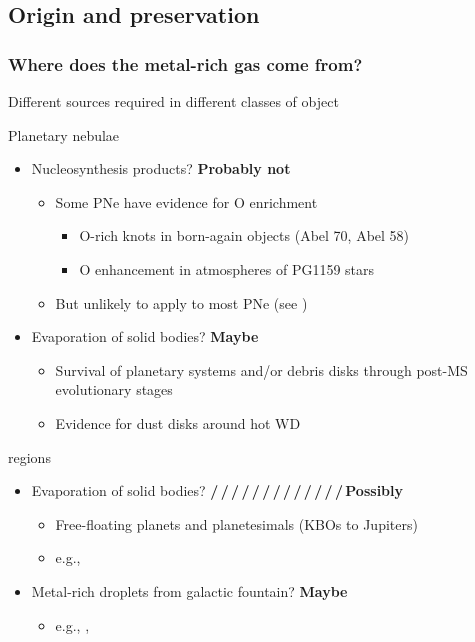 \documentclass[presentation, compress]{beamer}
\providecommand{\alert}[1]{\textbf{#1}}
\begin{document}
\subsection{Origin and preservation}
\begin{frame}
\frametitle{Where does the metal-rich gas come from?}
\label{sec-3-2}
Different sources required in different classes of object
\begin{overprint}
\begin{block}{Planetary nebulae}
\begin{itemize}
\item Nucleosynthesis products? \quad \alert{Probably not}
  \begin{itemize}
  \item Some PNe have evidence for O enrichment
    \begin{itemize}
    \item O-rich knots in born-again objects (Abel 70, Abel 58)
    \item O enhancement in atmospheres of PG1159 stars
    \end{itemize}
  \item But unlikely to apply to most PNe (see )
  \end{itemize}
\item Evaporation of solid bodies?  \quad \alert{Maybe}
  \begin{itemize}
  \item Survival of planetary systems and/or debris disks through post-MS evolutionary stages
  \item Evidence for dust disks around hot WD 
  \end{itemize}
\end{itemize}
\end{block}

\begin{block}{\hii{} regions}
\begin{itemize}
\item Evaporation of solid bodies? \quad \alert{\textcolor{structure.fg}{/\,/\,/\,/\,/\,/\,/\,/\,/\,/\,/\,/\,/\,}\quad Possibly}
  \begin{itemize}
  \item Free-floating planets and planetesimals (KBOs to Jupiters)
  \item e.g., 
  \end{itemize}
\item Metal-rich droplets from galactic fountain?  \quad \alert{Maybe}
  \begin{itemize}
  \item e.g., , 
  \end{itemize}
\end{itemize}
\end{block}

\end{overprint}

\end{frame}
\end{document}
